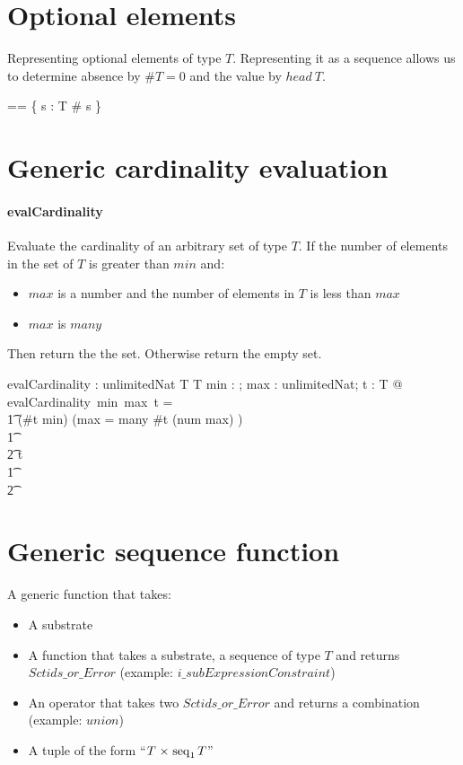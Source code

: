\documentclass{article}
\begin{document}
\section{Optional elements}
Representing optional elements of type $T$.  Representing it as a sequence allows us to
determine absence by $\#T = 0$ and the value by $head~T$. 

\begin{zed} 
  \optional[T] == \{ s : \seq T \mid \# s  \} 
\end{zed}

\section{Generic cardinality evaluation}
\paragraph{evalCardinality}
Evaluate the cardinality of an arbitrary set of type $T$.  If the number of elements in the set of $T$ is greater than $min$ and:
\begin{itemize}[noitemsep]
\item $max$ is a number and the number of elements in $T$ is less than $max$
\item $max$ is $many$
\end{itemize}
Then return the the set.  Otherwise return the empty set.

\begin{gendef}[T]
   evalCardinality : \nat \fun unlimitedNat \fun \power T \fun \power T
\where
   \forall min : \nat; max : unlimitedNat; t : \power T @ \\
evalCardinality~min~max~t = \\
\t1 \IF (\#t \geq min) \land (max = many \lor \#t \leq (num \inv max) ) \\
\t1 \THEN \\
\t2 t \\
\t1 \ELSE  \\
\t2 \emptyset
\end{gendef}

\section{Generic sequence function}
A generic function that takes:
\begin{itemize}[noitemsep]
\item A substrate
\item A function that takes a substrate, a sequence of type $T$ and returns $Sctids\_or\_Error$  (example: $i\_subExpressionConstraint$)
\item An operator that takes two $Sctids\_or\_Error$ and returns a combination (example: $union$)
\item A tuple of the form ``$T \mathrel{\times} \mathop{\mathrm{seq}}_1 T$''
\end{itemize}
\end{document}
